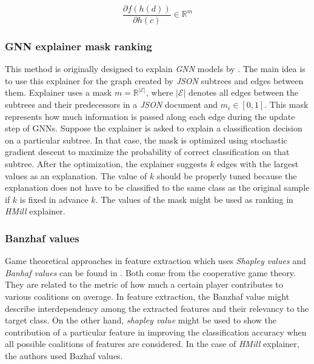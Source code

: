 \begin{equation} \label{eq:grad}
    \frac{\partial f(h(d))}{\partial h(c)} \in \mathbb{R}^m
\end{equation}


\subsubsection{GNN explainer mask ranking}
This method is originally designed to explain \emph{GNN} models by \cite{Ying2019}. The main idea is to use this explainer for the graph created by \emph{JSON} subtrees and edges between them. Explainer uses a mask $m=\mathbb{R}^{|\mathcal{E}|}$, where $|\mathcal{E}|$ denotes all edges between the subtrees and their predecessors in a \emph{JSON} document and $m_i\in[0,1]$. This mask represents how much information is passed along each edge during the update step of GNNs. Suppose the explainer is asked to explain a classification decision on a particular subtree. In that case, the mask is optimized using stochastic gradient descent to maximize the probability of correct classification on that subtree. After the optimization, the explainer suggests $k$ edges with the largest values as an explanation. The value of $k$ should be properly tuned because the explanation does not have to be classified to the same class as the original sample if $k$ is fixed in advance $k$. The values of the mask might be used as ranking in \emph{HMill} explainer.

\subsubsection{Banzhaf values}
Game theoretical approaches in feature extraction which uses \emph{Shapley values} and \emph{Banhaf values} can be found in \cite{Afghah2018}. Both come from the cooperative game theory. They are related to the metric of how much a certain player contributes to various coalitions on average. In feature extraction, the Banzhaf value might describe interdependency among the extracted features and their relevancy to the target class. On the other hand, \emph{shapley value} might be used to show the contribution of a particular feature in improving the classification accuracy when all possible coalitions of features are considered. In the case of \emph{HMill} explainer, the authors used Bazhaf values. 

